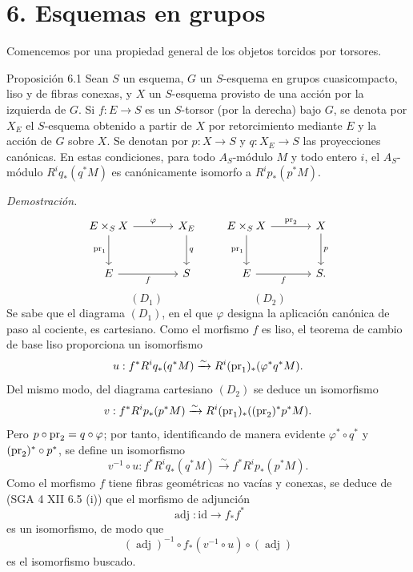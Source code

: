 \section*{6. Esquemas en grupos}

Comencemos por una propiedad general de los objetos torcidos por torsores.

\begin{statement}{Proposición 6.1}
Sean $S$ un esquema, $G$ un $S$-esquema en grupos cuasicompacto, liso y de fibras conexas, y $X$ un $S$-esquema provisto de una acción por la izquierda de $G$. Si $f:E\to S$ es un $S$-torsor (por la derecha) bajo $G$, se denota por $X_E$ el $S$-esquema obtenido a partir de $X$ por retorcimiento mediante $E$ y la acción de $G$ sobre $X$. Se denotan por $p:X\to S$ y $q:X_E\to S$ las proyecciones canónicas. En estas condiciones, para todo $A_S$-módulo $M$ y todo entero $i$, el $A_S$-módulo $R^iq_*(q^*M)$ es canónicamente isomorfo a $R^ip_*(p^*M)$.
\end{statement}

\emph{Demostración.}
\[
\begin{tikzcd}[column sep=large,row sep=large]
E\times_S X \arrow[r,"\varphi"] \arrow[d,"\pr_1"'] & X_E \arrow[d,"q"]\\
E \arrow[r,"f"'] & S
\end{tikzcd}
\qquad
\begin{tikzcd}[column sep=large,row sep=large]
E\times_S X \arrow[r,"\pr_2"] \arrow[d,"\pr_1"'] & X \arrow[d,"p"]\\
E \arrow[r,"f"'] & S .
\end{tikzcd}
\]
\[
(D_1)\qquad\qquad\qquad\qquad(D_2)
\]
Se sabe que el diagrama $(D_1)$, en el que $\varphi$ designa la aplicación canónica de paso al cociente, es cartesiano. Como el morfismo $f$ es liso, el teorema de cambio de base liso proporciona un isomorfismo
\[
u:f^*R^iq_*(q^*M)\xrightarrow{\sim}R^i(\operatorname{pr}_1)_*(\varphi^*q^*M).
\]
Del mismo modo, del diagrama cartesiano $(D_2)$ se deduce un isomorfismo
\[
v:f^*R^ip_*(p^*M)\xrightarrow{\sim}R^i(\operatorname{pr}_1)_*((\operatorname{pr}_2)^*p^*M).
\]
Pero $p\circ\operatorname{pr}_2=q\circ\varphi$; por tanto, identificando de manera evidente $\varphi^*\circ q^*$ y $(\operatorname{pr}_2)^*\circ p^*$, se define un isomorfismo
\[
v^{-1}\circ u:f^*R^iq_*(q^*M)\xrightarrow{\sim} f^*R^ip_*(p^*M).
\]
Como el morfismo $f$ tiene fibras geométricas no vacías y conexas, se deduce de (SGA 4 XII 6.5 (i)) que el morfismo de adjunción
\[
\operatorname{adj}:\mathrm{id}\to f_*f^*
\]
es un isomorfismo, de modo que
\[
(\operatorname{adj})^{-1}\circ f_*(v^{-1}\circ u)\circ(\operatorname{adj})
\]
es el isomorfismo buscado.
